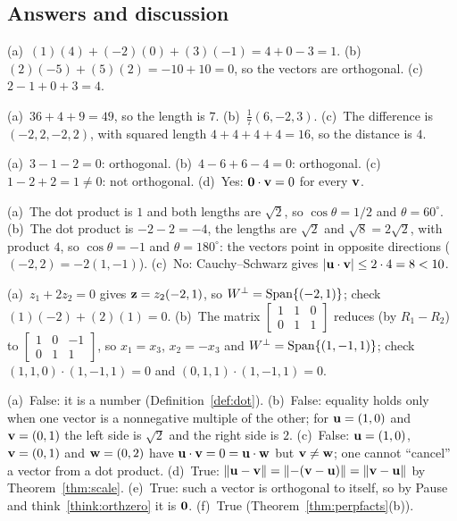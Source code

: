 \documentclass[11pt]{article}
\begin{document}
\subsection*{Answers and discussion}
\begin{description}[leftmargin=0pt,itemsep=5pt]
  \item[Knowledge Check \ref{kc:kcdot}.] (a)~$(1)(4)+(-2)(0)+(3)(-1)=4+0-3=1$. (b)~$(2)(-5)+(5)(2)=-10+10=0$, so the vectors are orthogonal. (c)~$2-1+0+3=4$.
  \item[Knowledge Check \ref{kc:kclen}.] (a)~$36+4+9=49$, so the length is $7$. (b)~$\tfrac17(6,-2,3)$. (c)~The difference is $(-2,2,-2,2)$, with squared length $4+4+4+4=16$, so the distance is $4$.
  \item[Knowledge Check \ref{kc:kcorth}.] (a)~$3-1-2=0$: orthogonal. (b)~$4-6+6-4=0$: orthogonal. (c)~$1-2+2=1\neq0$: not orthogonal. (d)~Yes: $\mathbf{0}\cdot\mathbf{v}=0$ for every $\mathbf{v}$.
  \item[Knowledge Check \ref{kc:kcangle}.] (a)~The dot product is $1$ and both lengths are $\sqrt2$, so $\cos\theta=1/2$ and $\theta=60^\circ$. (b)~The dot product is $-2-2=-4$, the lengths are $\sqrt2$ and $\sqrt8=2\sqrt2$, with product $4$, so $\cos\theta=-1$ and $\theta=180^\circ$: the vectors point in opposite directions ($(-2,2)=-2(1,-1)$). (c)~No: Cauchy--Schwarz gives $|\mathbf{u}\cdot\mathbf{v}|\le2\cdot4=8<10$.
  \item[Knowledge Check \ref{kc:kcperp}.] (a)~$z_1+2z_2=0$ gives $\mathbf{z}=z_2(-2,1)$, so $W^{\perp}=\operatorname{Span}\{(-2,1)\}$; check $(1)(-2)+(2)(1)=0$. (b)~The matrix $\begin{bmatrix}1&1&0\\0&1&1\end{bmatrix}$ reduces (by $R_1-R_2$) to $\begin{bmatrix}1&0&-1\\0&1&1\end{bmatrix}$, so $x_1=x_3$, $x_2=-x_3$ and $W^{\perp}=\operatorname{Span}\{(1,-1,1)\}$; check $(1,1,0)\cdot(1,-1,1)=0$ and $(0,1,1)\cdot(1,-1,1)=0$.
  \item[Knowledge Check \ref{kc:kctf}.] (a)~False: it is a number (Definition~\ref{def:dot}). (b)~False: equality holds only when one vector is a nonnegative multiple of the other; for $\mathbf{u}=(1,0)$ and $\mathbf{v}=(0,1)$ the left side is $\sqrt2$ and the right side is $2$. (c)~False: $\mathbf{u}=(1,0)$, $\mathbf{v}=(0,1)$ and $\mathbf{w}=(0,2)$ have $\mathbf{u}\cdot\mathbf{v}=0=\mathbf{u}\cdot\mathbf{w}$ but $\mathbf{v}\neq\mathbf{w}$; one cannot ``cancel'' a vector from a dot product. (d)~True: $\lVert\mathbf{u}-\mathbf{v}\rVert=\lVert-(\mathbf{v}-\mathbf{u})\rVert=\lVert\mathbf{v}-\mathbf{u}\rVert$ by Theorem~\ref{thm:scale}. (e)~True: such a vector is orthogonal to itself, so by Pause and think~\ref{think:orthzero} it is $\mathbf{0}$. (f)~True (Theorem~\ref{thm:perpfacts}(b)).

\end{description}
\end{document}
